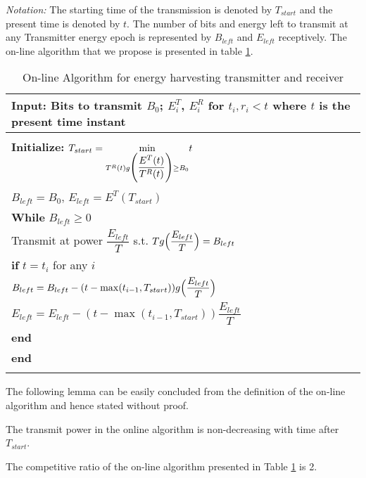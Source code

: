 \textit{Notation:} The starting time of the transmission is denoted by $T_{start}$ and the present time is denoted by $t$. The number of bits and energy left to transmit at any Transmitter energy epoch is represented by $B_{left}$ and $E_{left}$ receptively.
The on-line algorithm that we propose is presented in table \ref{online}.
\begin{table}
\begin{minipage}[b]{8cm}
\caption {On-line Algorithm for energy harvesting transmitter and receiver}
\begin{tabular}{p{7cm}}
\hline \textbf{Input}: Bits to transmit $B_0$; $E^T_i$, $E^R_i$ for $t_i,r_i<t$ where $t$ is the present time instant\\
\hline
\\
\textbf{Initialize:} $T_{start}=\underset{T^R(t)g\Bigg{(} \dfrac{E^T(t)}{T^R(t)}\Bigg{)}\ge B_0}\min t$
\\
\hspace{12mm}$B_{left}=B_0$, $E_{left}=E^T(T_{start})$
\\
\textbf{While} $B_{left} \ge 0$
\\
\hspace{4mm} Transmit at power $\dfrac{E_{left}}{T}$ s.t. $Tg\Big{(}\dfrac{E_{left}}{T}\Big{)}=B_{left}$ 
\\
\hspace{4mm} \textbf{if} $t=t_i$ for any $i$ 
\\
\hspace{7mm} $B_{left}=B_{left}-(t-\max (t_{i-1},T_{start}))g \Big{(}\dfrac{E_{left}}{T}\Big{)}$
\\
\hspace{7mm}$E_{left}=E_{left}-(t-\max (t_{i-1},T_{start}))\dfrac{E_{left}}{T}$
\\
\hspace{4mm}\textbf{end}
\\
\textbf{end}
\\
\hline
\label{online}
\end{tabular}
\end{minipage}
\end{table}
The following lemma can be easily concluded from the definition of the on-line algorithm and hence stated without proof.
\begin{lemma}
The transmit power in the online algorithm is non-decreasing with time after $T_{start}$.
\label{online_power}
\end{lemma}
\begin{theorem}
The competitive ratio of the on-line algorithm presented in Table \ref{online} is 2.
\end{theorem}
